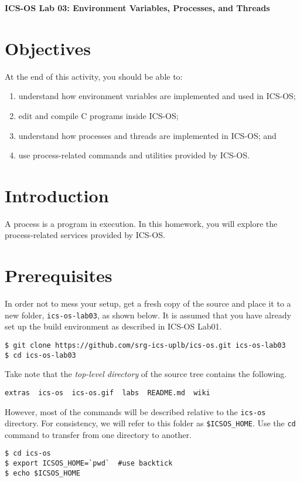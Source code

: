 \documentclass[a4paper, 11pt,oneside]{article}
\begin{document}
\begin{center}
   {\LARGE \textbf{ICS-OS Lab 03: Environment Variables, Processes, and Threads}}
\end{center}

\section*{Objectives}
   At the end of this activity, you should be able to:
   \begin{enumerate}[itemsep=0pt,parsep=0pt]
       \item understand how environment variables are implemented and used in ICS-OS;
       \item edit and compile C programs inside ICS-OS;
       \item understand how processes and threads are implemented in ICS-OS; and
       \item use process-related commands and utilities provided by ICS-OS.
   \end{enumerate}   

\section{Introduction}
A process is a program in execution. In this homework, you will explore the process-related services provided by ICS-OS. 

\section{Prerequisites}
In order not to mess your setup, get a fresh copy of the source and place it to a new folder, \texttt{ics-os-lab03}, as shown below. It is assumed that you have already set up the build environment as described in ICS-OS Lab01.

\begin{verbatim}
$ git clone https://github.com/srg-ics-uplb/ics-os.git ics-os-lab03
$ cd ics-os-lab03
\end{verbatim}

Take note that the \textit{top-level directory} of the source 
tree contains the following. 

\begin{verbatim}
extras  ics-os  ics-os.gif  labs  README.md  wiki
\end{verbatim}

However, most of the commands will be described relative to the \texttt{ics-os} directory.
For consistency, we will refer to this folder as \texttt{\$ICSOS\_HOME}. Use the \texttt{cd} 
command to transfer from one directory to another.
\begin{verbatim}
$ cd ics-os
$ export ICSOS_HOME=`pwd`  #use backtick
$ echo $ICSOS_HOME
\end{verbatim}
\end{document}
